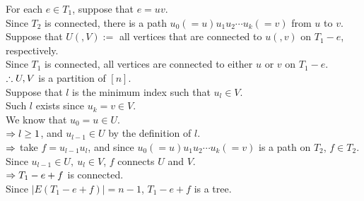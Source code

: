 \begin{pr}
For each $e\in T_1$, suppose that $e=uv$.\\
Since $T_2$ is connected, there is a path $u_0(=u)u_1u_2\cdots u_k(=v)$ from $u$ to $v$.\\
Suppose that $U(, V):=$ all vertices that are connected to $u(, v)$ on $T_1-e$, respectively.\\
Since $T_1$ is connected, all vertices are connected to either $u$ or $v$ on $T_1-e$.\\
$\therefore U, V$ is a partition of $[n]$.\\
Suppose that $l$ is the minimum index such that $u_l\in V$.\\
Such $l$ exists since $u_k=v\in V$.\\
We know that $u_0=u\in U$.\\
$\Rightarrow l\geq1$, and $u_{l-1}\in U$ by the definition of $l$.\\
$\Rightarrow$ take $f=u_{l-1}u_l$, and since $u_0(=u)u_1u_2\cdots u_k(=v)$ is a path on $T_2$, $f\in T_2$.\\
Since $u_{l-1}\in U,\ u_l\in V$, $f$ connects $U$ and $V$.\\
$\Rightarrow T_1-e+f$ is connected.\\
Since $|E(T_1-e+f)|=n-1$, $T_1-e+f$ is a tree.
\end{pr}
